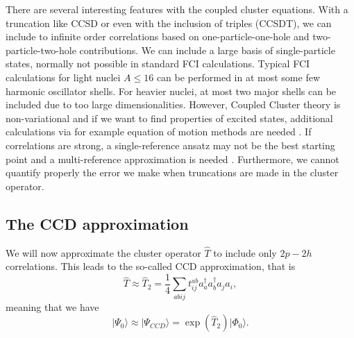   There are several interesting features with the coupled cluster
  equations. With a truncation like CCSD or even with the inclusion of
  triples (CCSDT), we can include to infinite order correlations based
  on one-particle-one-hole and two-particle-two-hole contributions.
  We can include a large basis of single-particle states, normally not
  possible in standard FCI calculations. Typical FCI calculations for
  light nuclei $A\le 16$ can be performed in at most some few harmonic
  oscillator shells. For heavier nuclei, at most two major shells can
  be included due to too large dimensionalities.  However, Coupled
  Cluster theory is non-variational and if we want to find properties
  of excited states, additional calculations via for example equation
  of motion methods are needed \cite{shavittbartlett2009,hagen2014}.
  If correlations are strong, a single-reference ansatz may not be the
  best starting point and a multi-reference approximation is needed
  \cite{jansen2015}. Furthermore, we cannot quantify properly the
  error we make when truncations are made in the cluster operator.

  \subsection{The CCD approximation}

  We will now approximate the cluster operator $\hat{T}$ to include
  only $2p-2h$ correlations. This leads to the so-called CCD
  approximation, that is
  \[
  \hat{T}\approx
  \hat{T}_2=\frac{1}{4}\sum_{abij}t_{ij}^{ab}a^{\dagger}_aa^{\dagger}_ba_ja_i,
  \]
  meaning that we have
  \[
  \vert \Psi_0 \rangle \approx \vert \Psi_{CCD} \rangle =
  \exp{\left(\hat{T}_2\right)}\vert \Phi_0\rangle.
  \]

